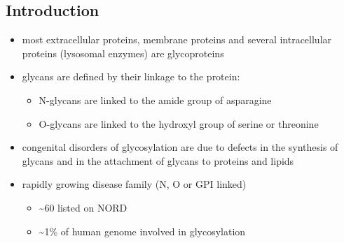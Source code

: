 \documentclass[12pt]{scrartcl}
\begin{document}
\subsection{Introduction}
\label{sec:orgcde0ddd}
\begin{itemize}
\item most extracellular proteins, membrane proteins and several
intracellular proteins (lysosomal enzymes) are glycoproteins

\item glycans are defined by their linkage to the protein:
\begin{itemize}
\item N-glycans are linked to the amide group of asparagine
\item O-glycans are linked to the hydroxyl group of serine or
threonine
\end{itemize}

\item congenital disorders of glycosylation are due to defects in the
synthesis of glycans and in the attachment of glycans to proteins
and lipids
\item rapidly growing disease family (N, O or GPI linked)
\begin{itemize}
\item \textasciitilde{}60 listed on NORD
\item \textasciitilde{}1\% of human genome involved in glycosylation
\end{itemize}
\end{itemize}
\end{document}
